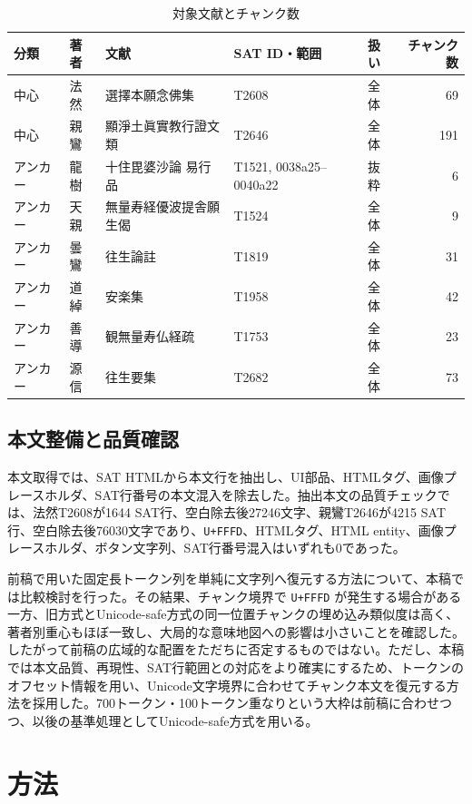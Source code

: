 \documentclass[uplatex,dvipdfmx,11pt,a4paper]{jsarticle}
\begin{document}
\begin{table}[H]
\centering
\small
\caption{対象文献とチャンク数}
\label{tab:corpus}
\begin{tabular}{@{}lllllr@{}}
\toprule
分類 & 著者 & 文献 & SAT ID・範囲 & 扱い & チャンク数 \\
\midrule
中心 & 法然 & 選擇本願念佛集 & T2608 & 全体 & 69 \\
中心 & 親鸞 & 顯淨土眞實教行證文類 & T2646 & 全体 & 191 \\
アンカー & 龍樹 & 十住毘婆沙論 易行品 & T1521, 0038a25--0040a22 & 抜粋 & 6 \\
アンカー & 天親 & 無量寿経優波提舎願生偈 & T1524 & 全体 & 9 \\
アンカー & 曇鸞 & 往生論註 & T1819 & 全体 & 31 \\
アンカー & 道綽 & 安楽集 & T1958 & 全体 & 42 \\
アンカー & 善導 & 観無量寿仏経疏 & T1753 & 全体 & 23 \\
アンカー & 源信 & 往生要集 & T2682 & 全体 & 73 \\
\bottomrule
\end{tabular}
\end{table}

\subsection{本文整備と品質確認}

本文取得では、SAT HTMLから本文行を抽出し、UI部品、HTMLタグ、画像プレースホルダ、SAT行番号の本文混入を除去した。抽出本文の品質チェックでは、法然T2608が1644 SAT行、空白除去後27246文字、親鸞T2646が4215 SAT行、空白除去後76030文字であり、\texttt{U+FFFD}、HTMLタグ、HTML entity、画像プレースホルダ、ボタン文字列、SAT行番号混入はいずれも0であった。

前稿で用いた固定長トークン列を単純に文字列へ復元する方法について、本稿では比較検討を行った。その結果、チャンク境界で \texttt{U+FFFD} が発生する場合がある一方、旧方式とUnicode-safe方式の同一位置チャンクの埋め込み類似度は高く、著者別重心もほぼ一致し、大局的な意味地図への影響は小さいことを確認した。したがって前稿の広域的な配置をただちに否定するものではない。ただし、本稿では本文品質、再現性、SAT行範囲との対応をより確実にするため、トークンのオフセット情報を用い、Unicode文字境界に合わせてチャンク本文を復元する方法を採用した。700トークン・100トークン重なりという大枠は前稿に合わせつつ、以後の基準処理としてUnicode-safe方式を用いる。

\section{方法}
\end{document}
